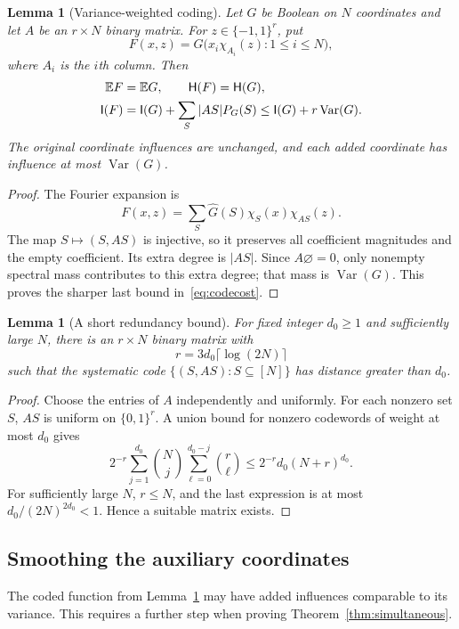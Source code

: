 \documentclass[11pt]{amsart}
\newtheorem{lemma}[theorem]{Lemma}
\theoremstyle{definition}
\theoremstyle{remark}
\newcommand{\bits}{\{-1,1\}}
\newcommand{\E}{\mathbb E}
\newcommand{\HH}{\mathsf H}
\newcommand{\I}{\mathsf I}
\newcommand{\wh}[1]{\widehat{#1}}
\newcommand{\Var}{\operatorname{Var}}
\begin{document}
\begin{lemma}[Variance-weighted coding]\label{lem:coding}
Let $G$ be Boolean on $N$ coordinates and let $A$ be an $r\times N$ binary matrix. For $z\in\bits^r$, put
\[
 F(x,z)=G\bigl(x_i\chi_{A_i}(z):1\le i\le N\bigr),
\]
where $A_i$ is the $i$th column. Then
\begin{align}
 \E F&=\E G,\qquad \HH(F)=\HH(G),\notag\\
 \I(F)&=\I(G)+\sum_S |AS|P_G(S)
 \le\I(G)+r\Var(G).\label{eq:codecost}
\end{align}
The original coordinate influences are unchanged, and each added coordinate has influence at most $\Var(G)$.
\end{lemma}
\begin{proof}
The Fourier expansion is
\[
 F(x,z)=\sum_S\wh G(S)\chi_S(x)\chi_{AS}(z).
\]
The map $S\mapsto(S,AS)$ is injective, so it preserves all coefficient magnitudes and the empty coefficient. Its extra degree is $|AS|$. Since $A\varnothing=0$, only nonempty spectral mass contributes to this extra degree; that mass is $\Var(G)$. This proves the sharper last bound in~\eqref{eq:codecost}.
\end{proof}

\begin{lemma}[A short redundancy bound]\label{lem:codeexist}
For fixed integer $d_0\ge1$ and sufficiently large $N$, there is an $r\times N$ binary matrix with
\[
 r=3d_0\lceil\log(2N)\rceil
\]
such that the systematic code $\{(S,AS):S\subseteq[N]\}$ has distance greater than $d_0$.
\end{lemma}
\begin{proof}
Choose the entries of $A$ independently and uniformly. For each nonzero set $S$, $AS$ is uniform on $\{0,1\}^r$. A union bound for nonzero codewords of weight at most $d_0$ gives
\[
 2^{-r}\sum_{j=1}^{d_0}\binom Nj
       \sum_{\ell=0}^{d_0-j}\binom r\ell
 \le2^{-r}d_0(N+r)^{d_0}.
\]
For sufficiently large $N$, $r\le N$, and the last expression is at most $d_0/(2N)^{2d_0}<1$. Hence a suitable matrix exists.
\end{proof}

\subsection{Smoothing the auxiliary coordinates}

The coded function from Lemma~\ref{lem:coding} may have added influences comparable to its variance. This requires a further step when proving Theorem~\ref{thm:simultaneous}.
\end{document}
